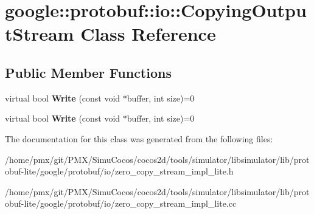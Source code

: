 \hypertarget{classgoogle_1_1protobuf_1_1io_1_1CopyingOutputStream}{}\section{google\+:\+:protobuf\+:\+:io\+:\+:Copying\+Output\+Stream Class Reference}
\label{classgoogle_1_1protobuf_1_1io_1_1CopyingOutputStream}
\subsection*{Public Member Functions}
\begin{DoxyCompactItemize}
\item 
\mbox{\label{classgoogle_1_1protobuf_1_1io_1_1CopyingOutputStream_a1990ba311612ad7067cfed45914995f3}} 
virtual bool {\bfseries Write} (const void $\ast$buffer, int size)=0
\item 
\mbox{\label{classgoogle_1_1protobuf_1_1io_1_1CopyingOutputStream_a1990ba311612ad7067cfed45914995f3}} 
virtual bool {\bfseries Write} (const void $\ast$buffer, int size)=0
\end{DoxyCompactItemize}


The documentation for this class was generated from the following files\+:\begin{DoxyCompactItemize}
\item 
/home/pmx/git/\+P\+M\+X/\+Simu\+Cocos/cocos2d/tools/simulator/libsimulator/lib/protobuf-\/lite/google/protobuf/io/zero\+\_\+copy\+\_\+stream\+\_\+impl\+\_\+lite.\+h\item 
/home/pmx/git/\+P\+M\+X/\+Simu\+Cocos/cocos2d/tools/simulator/libsimulator/lib/protobuf-\/lite/google/protobuf/io/zero\+\_\+copy\+\_\+stream\+\_\+impl\+\_\+lite.\+cc\end{DoxyCompactItemize}
